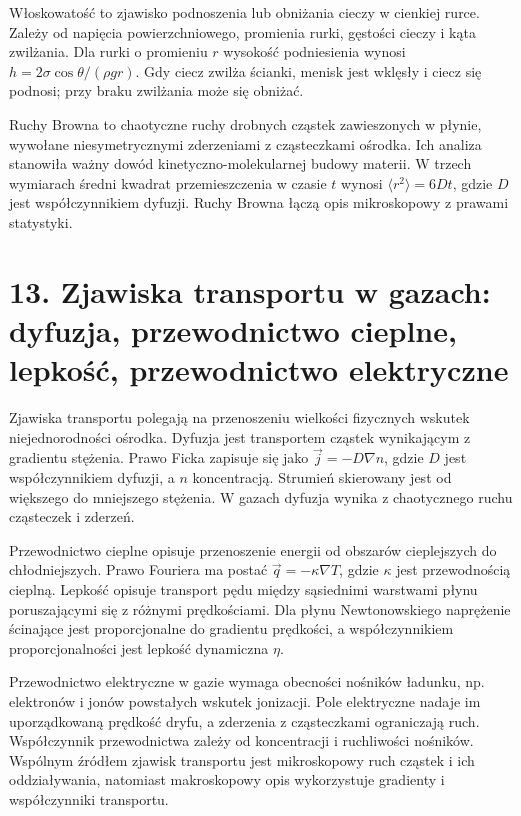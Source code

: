 \documentclass[11pt,a4paper,oneside]{report}
\begin{document}
Włoskowatość to zjawisko podnoszenia lub obniżania cieczy w cienkiej rurce. Zależy od napięcia powierzchniowego, promienia rurki, gęstości cieczy i kąta zwilżania. Dla rurki o promieniu \(r\) wysokość podniesienia wynosi \(h=2\sigma\cos\theta/(\rho gr)\). Gdy ciecz zwilża ścianki, menisk jest wklęsły i ciecz się podnosi; przy braku zwilżania może się obniżać.

Ruchy Browna to chaotyczne ruchy drobnych cząstek zawieszonych w płynie, wywołane niesymetrycznymi zderzeniami z cząsteczkami ośrodka. Ich analiza stanowiła ważny dowód kinetyczno-molekularnej budowy materii. W trzech wymiarach średni kwadrat przemieszczenia w czasie \(t\) wynosi \(\langle r^2\rangle=6Dt\), gdzie \(D\) jest współczynnikiem dyfuzji. Ruchy Browna łączą opis mikroskopowy z prawami statystyki.

\section{13. Zjawiska transportu w gazach: dyfuzja, przewodnictwo cieplne, lepkość, przewodnictwo elektryczne}
Zjawiska transportu polegają na przenoszeniu wielkości fizycznych wskutek niejednorodności ośrodka. Dyfuzja jest transportem cząstek wynikającym z gradientu stężenia. Prawo Ficka zapisuje się jako \(\vec j=-D\nabla n\), gdzie \(D\) jest współczynnikiem dyfuzji, a \(n\) koncentracją. Strumień skierowany jest od większego do mniejszego stężenia. W gazach dyfuzja wynika z chaotycznego ruchu cząsteczek i zderzeń.

Przewodnictwo cieplne opisuje przenoszenie energii od obszarów cieplejszych do chłodniejszych. Prawo Fouriera ma postać \(\vec q=-\kappa\nabla T\), gdzie \(\kappa\) jest przewodnością cieplną. Lepkość opisuje transport pędu między sąsiednimi warstwami płynu poruszającymi się z różnymi prędkościami. Dla płynu Newtonowskiego naprężenie ścinające jest proporcjonalne do gradientu prędkości, a współczynnikiem proporcjonalności jest lepkość dynamiczna \(\eta\).

Przewodnictwo elektryczne w gazie wymaga obecności nośników ładunku, np. elektronów i jonów powstałych wskutek jonizacji. Pole elektryczne nadaje im uporządkowaną prędkość dryfu, a zderzenia z cząsteczkami ograniczają ruch. Współczynnik przewodnictwa zależy od koncentracji i ruchliwości nośników. Wspólnym źródłem zjawisk transportu jest mikroskopowy ruch cząstek i ich oddziaływania, natomiast makroskopowy opis wykorzystuje gradienty i współczynniki transportu.
\end{document}
